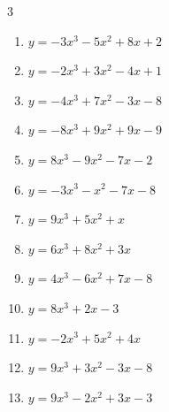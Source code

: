 \begin{multicols}{3}
\begin{enumerate}
  \item $y=-3x^{3}-5x^{2}+8x+2$


  \item $y=-2x^{3}+3x^{2}-4x+1$


  \item $y=-4x^{3}+7x^{2}-3x-8$


  \item $y=-8x^{3}+9x^{2}+9x-9$


  \item $y=8x^{3}-9x^{2}-7x-2$


  \item $y=-3x^{3}-x^{2}-7x-8$


  \item $y=9x^{3}+5x^{2}+x$


  \item $y=6x^{3}+8x^{2}+3x$


  \item $y=4x^{3}-6x^{2}+7x-8$


  \item $y=8x^{3}+2x-3$


  \item $y=-2x^{3}+5x^{2}+4x$


\columnbreak %

  \item $y=9x^{3}+3x^{2}-3x-8$


  \item $y=9x^{3}-2x^{2}+3x-3$


\end{enumerate}
\end{multicols}
